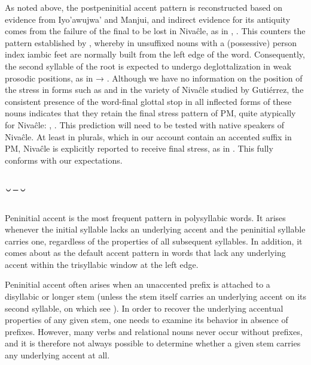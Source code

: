 As noted above, the postpeninitial accent pattern is reconstructed based on evidence from Iyo'awujwa' and Manjui, and indirect evidence for its antiquity comes from the failure of the final  to be lost in Nivaĉle, as in ,  \citep[56, 103]{JS16}. This counters the pattern established by \citet[182–194]{AnG15}, whereby in unsuffixed nouns with a (possessive) person index iambic feet are normally built from the left edge of the word. Consequently, the second syllable of the root is expected to undergo deglottalization in weak prosodic positions, as in  →  \citep[186]{AnG15}. Although we have no information on the position of the stress in forms such as  and  in the variety of Nivaĉle studied by Gutiérrez, the consistent presence of the word-final glottal stop in all inflected forms of these nouns indicates that they retain the final stress pattern of PM, quite atypically for Nivaĉle: , . This prediction will need to be tested with native speakers of Nivaĉle. At least in plurals, which in our account contain an accented suffix in PM, Nivaĉle is explicitly reported to receive final stress, as in  \citep[204]{AnG15}. This fully conforms with our expectations.

\subsection{˘¯˘} \label{corta-larga-corta}

Peninitial accent is the most frequent pattern in polysyllabic words. It arises whenever the initial syllable lacks an underlying accent and the peninitial syllable carries one, regardless of the properties of all subsequent syllables. In addition, it comes about as the default accent pattern in words that lack any underlying accent within the trisyllabic window at the left edge.

Peninitial accent often arises when an unaccented prefix is attached to a disyllabic or longer stem (unless the stem itself carries an underlying accent on its second syllable, on which see ). In order to recover the underlying accentual properties of any given stem, one needs to examine its behavior in absence of prefixes. However, many verbs and relational nouns never occur without prefixes, and it is therefore not always possible to determine whether a given stem carries any underlying accent at all.

